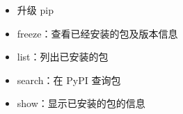 \documentclass[letterpaper,10pt,english]{sphinxmanual}
\begin{document}
\begin{itemize}
\item {} 
升级 pip

%
\begin{sphinxVerbatim}[commandchars=\\\{\}]
   
     
\end{sphinxVerbatim}

\item {} 
freeze：查看已经安装的包及版本信息

\item {} 
list：列出已安装的包

%
\begin{sphinxVerbatim}[commandchars=\\\{\}]
   
\end{sphinxVerbatim}

\item {} 
search：在 PyPI 查询包

%
\begin{sphinxVerbatim}[commandchars=\\\{\}]
  
\end{sphinxVerbatim}

\item {} 
show：显示已安装的包的信息

%
\begin{sphinxVerbatim}[commandchars=\\\{\}]
  
\end{sphinxVerbatim}

\end{itemize}
\end{document}
